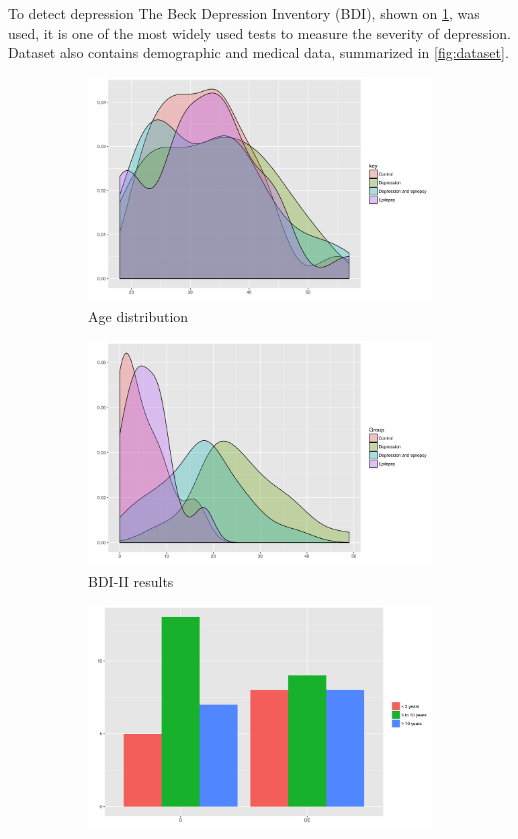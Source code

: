 \documentclass[12pt]{extarticle}
\theoremstyle{definition}
\theoremstyle{remark}
\begin{document}
	To detect depression The Beck Depression Inventory (BDI), shown on \cref{fig:bdi},  was used, it is one of the most widely used tests to measure the severity of depression. Dataset also contains demographic and medical data, summarized in \cref{fig:dataset}.
	\begin{figure}[H]
		\begin{subfigure}[b]{0.48\textwidth}
			\centering
			\includegraphics[width=.95\linewidth]{pic/Age.png}
			\caption{Age distribution}
		\end{subfigure}%
		\begin{subfigure}[b]{0.48\textwidth}
			\centering
			\includegraphics[width=.95\linewidth]{pic/BDI.png}
			\caption{BDI-II results}
			\label{fig:bdi}
		\end{subfigure}%
		\hfill
		\begin{subfigure}[b]{0.48\textwidth}
			\centering
			\includegraphics[width=.95\linewidth]{pic/Dep_dur.png}

\end{subfigure}
\end{figure}
\end{document}
